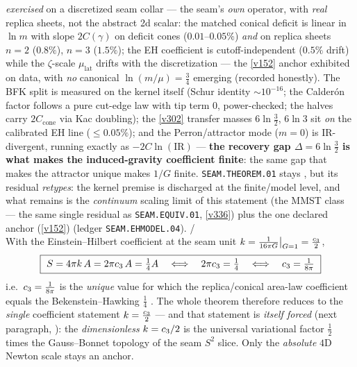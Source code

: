 \begin{gapbox}
\emph{exercised} on a discretized seam collar --- the seam's \emph{own} operator, with
\emph{real} replica sheets, not the abstract 2d scalar: the matched conical deficit is linear
in $\ln m$ with slope $2C(\gamma)$ on deficit cones ($0.01$--$0.05\%$) \emph{and} on replica
sheets $n{=}2$ ($0.8\%$), $n{=}3$ ($1.5\%$); the EH coefficient is cutoff-independent
($0.5\%$ drift) while the $\zeta$-scale $\mu_{\mathrm{lat}}$ drifts with the discretization
--- the \vref{v152} anchor exhibited on data, with \emph{no} canonical
$\ln(m/\mu){=}\tfrac34$ emerging (recorded honestly). The BFK split is measured on the
kernel itself (Schur identity ${\sim}10^{-16}$; the Calder\'on factor follows a pure
cut-edge law with tip term $0$, power-checked; the halves carry $2C_{\mathrm{cone}}$ via Kac
doubling); the \vref{v302} transfer masses $6\ln\tfrac32$, $6\ln 3$ sit \emph{on} the
calibrated EH line ($\le0.05\%$); and the Perron/attractor mode ($m{=}0$) is IR-divergent,
running exactly as $-2C\ln(\mathrm{IR})$ --- \textbf{the recovery gap
$\Delta{=}6\ln\tfrac32$ is what makes the induced-gravity coefficient finite}: the same gap
that makes the attractor unique makes $1/G$ finite. \texttt{SEAM.THEOREM.01} stays \mO, but
its residual \emph{retypes}: the kernel premise is discharged at the finite/model level, and
what remains is the \emph{continuum} scaling limit of this statement (the MMST class --- the
same single residual as \texttt{SEAM.EQUIV.01}, \vref{v336}) plus the one declared anchor
(\vref{v152}) (ledger \texttt{SEAM.EHMODEL.04}). \mE/\mO
\smallskip\\
With the Einstein--Hilbert coefficient at the seam unit
$k=\tfrac1{16\pi G}\big|_{G=1}=\tfrac{c_3}2$,
\[
  \boxed{\ S=4\pi k\,A=2\pi\cthree\,A=\tfrac14 A\quad\Longleftrightarrow\quad 2\pi\cthree=\tfrac14\quad\Longleftrightarrow\quad \cthree=\tfrac1{8\pi}\ }
\]
i.e.\ $c_3=\tfrac1{8\pi}$ is the \emph{unique} value for which the replica/conical area-law coefficient
equals the Bekenstein--Hawking $\tfrac14$ \mE. The whole theorem therefore reduces to the \emph{single}
coefficient statement $k=\tfrac{c_3}2$ --- and that statement is \emph{itself forced} (next paragraph,
): the \emph{dimensionless} $k=c_3/2$ is the universal variational factor
$\tfrac12$ times the Gauss--Bonnet topology of the seam $S^2$ slice. Only the \emph{absolute} $4$D Newton
scale stays an anchor.


\end{gapbox}
